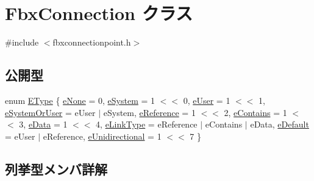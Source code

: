 \hypertarget{class_fbx_connection}{}\section{Fbx\+Connection クラス}
\label{class_fbx_connection}


{\ttfamily \#include $<$fbxconnectionpoint.\+h$>$}

\subsection*{公開型}
\begin{DoxyCompactItemize}
\item 
enum \hyperlink{class_fbx_connection_a3df448a5db356652ab99fd2be2553749}{E\+Type} \{ \newline
\hyperlink{class_fbx_connection_a3df448a5db356652ab99fd2be2553749a47aa04870c3c0769263e3972e67e9ebe}{e\+None} = 0, 
\hyperlink{class_fbx_connection_a3df448a5db356652ab99fd2be2553749a92429761695ae31e7bc3257c79881f71}{e\+System} = 1 $<$$<$ 0, 
\hyperlink{class_fbx_connection_a3df448a5db356652ab99fd2be2553749a49fcc02ebff96f18851b208474307ba8}{e\+User} = 1 $<$$<$ 1, 
\hyperlink{class_fbx_connection_a3df448a5db356652ab99fd2be2553749abf06b5ecc849595c80f9da875da1175b}{e\+System\+Or\+User} = e\+User $\vert$ e\+System, 
\newline
\hyperlink{class_fbx_connection_a3df448a5db356652ab99fd2be2553749a7ec0099e91989fc4bf05e47bd43c4681}{e\+Reference} = 1 $<$$<$ 2, 
\hyperlink{class_fbx_connection_a3df448a5db356652ab99fd2be2553749a4415e3b73e6a0d70bcc92b0082bb6b51}{e\+Contains} = 1 $<$$<$ 3, 
\hyperlink{class_fbx_connection_a3df448a5db356652ab99fd2be2553749a09096c73e898aa5a553c55b4b6afd571}{e\+Data} = 1 $<$$<$ 4, 
\hyperlink{class_fbx_connection_a3df448a5db356652ab99fd2be2553749a2fd0b59d9b15aefe864aa42541dac350}{e\+Link\+Type} = e\+Reference $\vert$ e\+Contains $\vert$ e\+Data, 
\newline
\hyperlink{class_fbx_connection_a3df448a5db356652ab99fd2be2553749a93ca385d7cc25fef28232a2d10b836e3}{e\+Default} = e\+User $\vert$ e\+Reference, 
\hyperlink{class_fbx_connection_a3df448a5db356652ab99fd2be2553749ab0ed7d506ad79f538e46cf3fa111df5a}{e\+Unidirectional} = 1 $<$$<$ 7
 \}
\end{DoxyCompactItemize}


\subsection{列挙型メンバ詳解}
\mbox{\label{class_fbx_connection_a3df448a5db356652ab99fd2be2553749}} 
